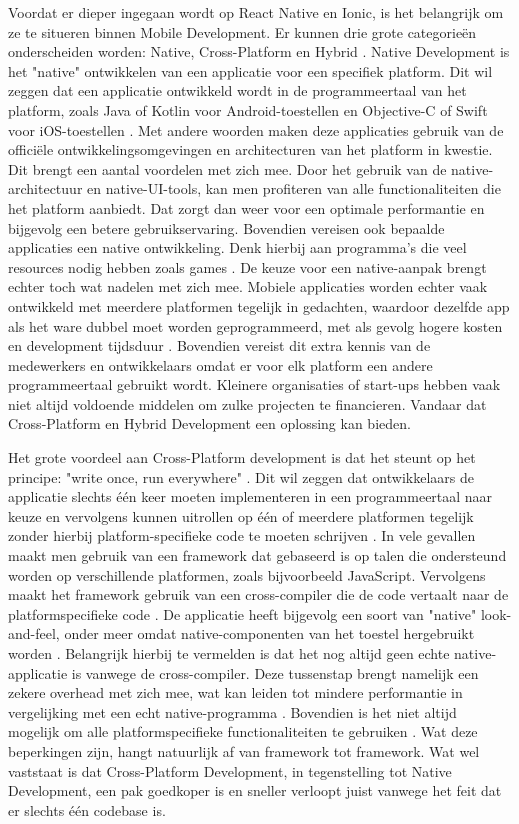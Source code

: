 Voordat er dieper ingegaan wordt op React Native en Ionic, is het belangrijk om ze te situeren binnen Mobile Development. Er kunnen drie grote categorieën onderscheiden worden: Native, Cross-Platform en Hybrid \autocite{Bron12}. Native Development is het "native" ontwikkelen van een applicatie voor een specifiek platform. Dit wil zeggen dat een applicatie ontwikkeld wordt in de programmeertaal van het platform, zoals Java of Kotlin voor Android-toestellen en Objective-C of Swift voor iOS-toestellen \autocite{Bron1, Bron11}. Met andere woorden maken deze applicaties gebruik van de officiële ontwikkelingsomgevingen en architecturen van het platform in kwestie. Dit brengt een aantal voordelen met zich mee. Door het gebruik van de native-architectuur en native-UI-tools, kan men profiteren van alle functionaliteiten die het platform aanbiedt. Dat zorgt dan weer voor een optimale performantie en bijgevolg een betere gebruikservaring. Bovendien vereisen ook bepaalde applicaties een native ontwikkeling. Denk hierbij aan programma's die veel resources nodig hebben zoals games \autocite{Bron12}. De keuze voor een native-aanpak brengt echter toch wat nadelen met zich mee. Mobiele applicaties worden echter vaak ontwikkeld met meerdere platformen tegelijk in gedachten, waardoor dezelfde app als het ware dubbel moet worden geprogrammeerd, met als gevolg hogere kosten en development tijdsduur \autocite{Bron12}. Bovendien vereist dit extra kennis van de medewerkers en ontwikkelaars omdat er voor elk platform een andere programmeertaal gebruikt wordt. Kleinere organisaties of start-ups hebben vaak niet altijd voldoende middelen om zulke projecten te financieren. Vandaar dat Cross-Platform en Hybrid Development een oplossing kan bieden.

Het grote voordeel aan Cross-Platform development is dat het steunt op het principe: "write once, run everywhere" \autocite{Bron12}. Dit wil zeggen dat ontwikkelaars de applicatie slechts één keer moeten implementeren in een programmeertaal naar keuze en vervolgens kunnen uitrollen op één of meerdere platformen tegelijk zonder hierbij platform-specifieke code te moeten schrijven \autocite{Bron12}. In vele gevallen maakt men gebruik van een framework dat gebaseerd is op talen die ondersteund worden op verschillende platformen, zoals bijvoorbeeld JavaScript. Vervolgens maakt het framework gebruik van een cross-compiler die de code vertaalt naar de platformspecifieke code \autocite{Bron1}. De applicatie heeft bijgevolg een soort van "native" look-and-feel, onder meer omdat native-componenten van het toestel hergebruikt worden \autocite{Bron2}. Belangrijk hierbij te vermelden is dat het nog altijd geen echte native-applicatie is vanwege de cross-compiler. Deze tussenstap brengt namelijk een zekere overhead met zich mee, wat kan leiden tot mindere performantie in vergelijking met een echt native-programma \autocite{Bron12}. Bovendien is het niet altijd mogelijk om alle platformspecifieke functionaliteiten te gebruiken \autocite{Bron12}. Wat deze beperkingen zijn, hangt natuurlijk af van framework tot framework. Wat wel vaststaat is dat Cross-Platform Development, in tegenstelling tot Native Development, een pak goedkoper is en sneller verloopt juist vanwege het feit dat er slechts één codebase is.

